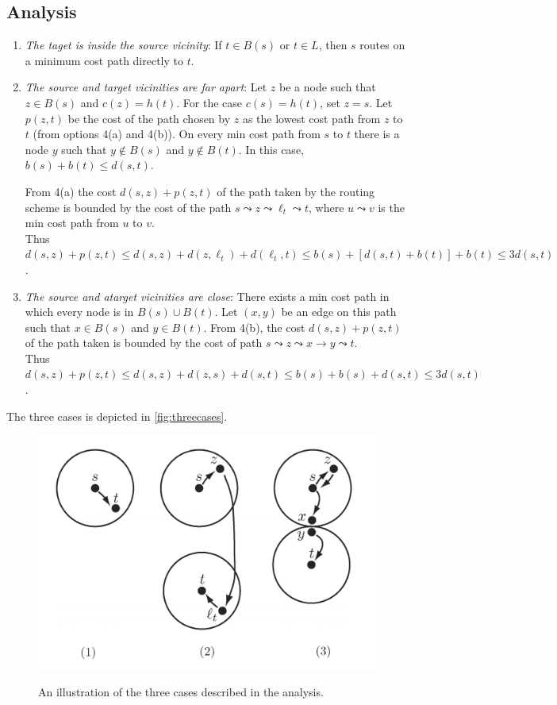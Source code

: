 \subsection{Analysis}
\begin{enumerate}
    \item \textit{The taget is inside the source vicinity}: If $t\in B(s)$ or $t\in L$, then $s$ routes on a minimum cost path directly to $t$.
    \item \textit{The source and target vicinities are far apart}: Let $z$ be a node such that $z\in B(s)$ and $c(z)=h(t)$. For the case $c(s)=h(t)$, set $z=s$. Let $p(z,t)$ be the cost of the path chosen by $z$ as the lowest cost   path from $z$ to $t$ (from options 4(a) and 4(b)).
    On every min cost path from $s$ to $t$ there is a node $y$ such that $y\not\in B(s)$ and $y\not\in B(t)$. In this case, $b(s)+b(t)\leq d(s,t)$.

    From 4(a) the cost $d(s,z)+p(z, t)$ of the path taken by the routing scheme is bounded by the cost of the path $s\leadsto z\leadsto \ell_t\leadsto t$, where $u\leadsto v$ is the min cost path from $u$ to $v$.\\
    Thus $d(s,z)+p(z,t) \leq d(s,z)+d(z,\ell_t)+d(\ell_t,t) \leq b(s) + [d(s,t) + b(t)] + b(t) \leq 3d(s,t)$.
    \item \textit{The source and atarget vicinities are close}: There exists a min cost path in which every node is in $B(s)\cup B(t)$. Let $(x,y)$ be an edge on this path such that $x\in B(s)$ and $y\in B(t)$. From 4(b), the cost $d(s,z)+p(z,t)$ of the path taken is bounded by the cost of path $s\leadsto z\leadsto x\rightarrow y \leadsto t$.\\
    Thus $d(s,z)+p(z,t) \leq d(s,z) + d(z,s) + d(s,t) \leq b(s)+b(s)+d(s,t)\leq 3d(s,t)$.
\end{enumerate}
The three cases is depicted in \autoref{fig:threecases}.
\begin{figure}[htbp]
    \centering
    \includegraphics[scale=0.3]{images/threecases.png} 
    \label{fig:threecases}
    \caption{An illustration of the three cases described in the analysis.}
\end{figure}



